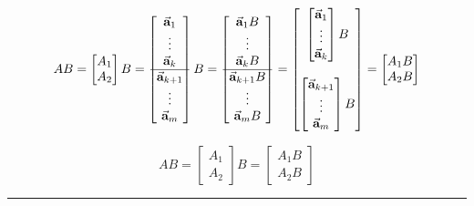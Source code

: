 \begin{enumerate}
 	\[ AB = \begin{bmatrix} A_1 \\ A_2 \end{bmatrix} B = \begin{bmatrix} \vec{{\bf a}}_1  \\ \vdots   \\ \vec{{\bf a}}_k \\ \hline \vec{{\bf a}}_{k+1} \\ \vdots \\  \vec{{\bf a}}_m  \end{bmatrix} B = \begin{bmatrix} \vec{{\bf a}}_1 B  \\ \vdots   \\ \vec{{\bf a}}_k B \\ \hline \vec{{\bf a}}_{k+1} B \\ \vdots \\  \vec{{\bf a}}_m B  \end{bmatrix} =  \begin{bmatrix}  \begin{bmatrix} \vec{{\bf a}}_1   \\ \vdots   \\ \vec{{\bf a}}_k  \end{bmatrix}  B  \\  \\  \begin{bmatrix} \vec{{\bf a}}_{k+1}  \\ \vdots \\  \vec{{\bf a}}_m  \end{bmatrix}  B \end{bmatrix}  = \begin{bmatrix} A_1 B \\ A_2 B \end{bmatrix} \]
 	
	
	
	
	
	\begin{tcolorbox}[colback=yellow!10!,colframe=gray!15!]
	\[ AB = \begin{bmatrix} A_1 \\ A_2 \end{bmatrix} B = \begin{bmatrix} A_1 B \\ A_2 B \end{bmatrix} \]
	\end{tcolorbox}
	
	
\rule[0.01in]{\textwidth}{0.0025in}


\end{enumerate}
